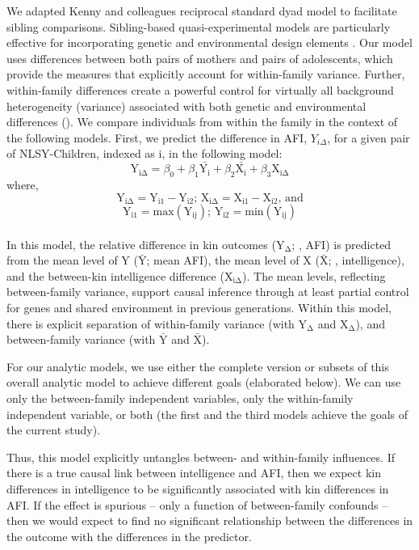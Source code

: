 We adapted Kenny and colleagues \citeyearpar{kenny2001social,kenny2006dyadic} reciprocal standard dyad model to facilitate sibling comparisons. Sibling-based quasi-experimental models are particularly effective for incorporating genetic and environmental design elements \citep{Lahey2010,Rutter2007}. Our model uses differences between both pairs of mothers and pairs of adolescents, which provide the measures that explicitly account for within-family variance. Further, within-family differences create a powerful control for virtually all background heterogeneity (variance) associated with both genetic and environmental differences (\citeauthor{Lahey2010}). We compare individuals from within the family in the context of the following models. First, we predict the difference in AFI, $Y_{i\Delta}$, for a given pair of NLSY-Children, indexed as i, in the following model:
\begin{equation}\label{equation_discord_main}
\mathrm{Y_{i\Delta}} = \beta_0 + \beta_1\mathrm{\bar{Y_{i}}} + \beta_2\mathrm{\bar{X_{i}}} + \beta_3\mathrm{X_{i\Delta}}
\end{equation}\vspace{-10pt}
where,
\begin{equation}\label{equation_discord_defs_delta}
\mathrm{Y_{i\Delta}} = \mathrm{Y_{i1}} - \mathrm{Y_{i2}};\, \mathrm{X_{i\Delta}} = \mathrm{X_{i1}} - \mathrm{X_{i2}},\, \mathrm{and}
\end{equation}
\begin{equation}\label{equation_discord_defs_min}
\mathrm{Y_{i1}} = \mathrm{max}(\mathrm{Y_{ij}});\, \mathrm{Y_{i2}} = \mathrm{min}(\mathrm{Y_{ij}})
\end{equation}\\

In this model, the relative difference in kin outcomes ($\mathrm{Y_{\Delta}}$; \eg, AFI) is predicted from the mean level of Y ($\mathrm{\bar{Y}}$; \eg mean AFI), the mean level of X ($\mathrm{\bar{X}}$; \eg, intelligence), and the between-kin intelligence difference ($\mathrm{X_{i\Delta}}$). The mean levels, reflecting between-family variance, support causal inference through at least partial control for genes and shared environment in previous generations. Within this model, there is explicit separation of within-family variance (with $\mathrm{Y_{\Delta}}$ and $\mathrm{X_{\Delta}}$), and between-family variance (with $\mathrm{\bar{Y}}$ and $\mathrm{\bar{X}}$).

For our analytic models, we use either the complete version or subsets of this overall analytic model to achieve different goals (elaborated below).  We can use only the between-family independent variables, only the within-family independent variable, or both (the first and the third models achieve the goals of the current study).

Thus, this model explicitly untangles between- and within-family influences. If there is a true causal link between intelligence and AFI, then we expect kin differences in intelligence to be significantly associated with kin differences in AFI. If the effect is spurious -- only a function of between-family confounds -- then we would expect to find no significant relationship between the differences in the outcome with the differences in the predictor.